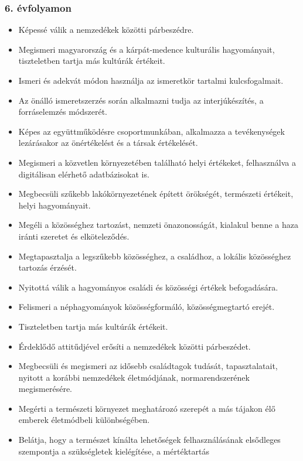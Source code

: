 \hypertarget{evfolyamon-18}{%
\subsubsection{6. évfolyamon}\label{evfolyamon-18}}

\begin{itemize}
\item
  Képessé válik a nemzedékek közötti párbeszédre.
\item
  Megismeri magyarország és a kárpát-medence kulturális hagyományait,
  tiszteletben tartja más kultúrák értékeit.
\item
  Ismeri és adekvát módon használja az ismeretkör tartalmi
  kulcsfogalmait.
\item
  Az önálló ismeretszerzés során alkalmazni tudja az interjúkészítés, a
  forráselemzés módszerét.
\item
  Képes az együttműködésre csoportmunkában, alkalmazza a tevékenységek
  lezárásakor az önértékelést és a társak értékelését.
\item
  Megismeri a közvetlen környezetében található helyi értékeket,
  felhasználva a digitálisan elérhető adatbázisokat is.
\item
  Megbecsüli szűkebb lakókörnyezetének épített örökségét, természeti
  értékeit, helyi hagyományait.
\item
  Megéli a közösséghez tartozást, nemzeti önazonosságát, kialakul benne
  a haza iránti szeretet és elköteleződés.
\item
  Megtapasztalja a legszűkebb közösséghez, a családhoz, a lokális
  közösséghez tartozás érzését.
\item
  Nyitottá válik a hagyományos családi és közösségi értékek
  befogadására.
\item
  Felismeri a néphagyományok közösségformáló, közösségmegtartó erejét.
\item
  Tiszteletben tartja más kultúrák értékeit.
\item
  Érdeklődő attitűdjével erősíti a nemzedékek közötti párbeszédet.
\item
  Megbecsüli és megismeri az idősebb családtagok tudását,
  tapasztalatait, nyitott a korábbi nemzedékek életmódjának,
  normarendszerének megismerésére.
\item
  Megérti a természeti környezet meghatározó szerepét a más tájakon élő
  emberek életmódbeli különbségében.
\item
  Belátja, hogy a természet kínálta lehetőségek felhasználásának
  elsődleges szempontja a szükségletek kielégítése, a mértéktartás

\end{itemize}
